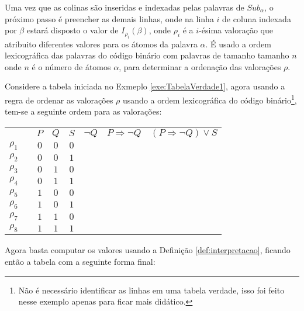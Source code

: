 Uma vez que as colinas são inseridas e indexadas pelas palavras de $Sub_\alpha$, o próximo passo é preencher as demais linhas, onde na linha $i$ de coluna indexada por $\beta$ estará disposto o valor de $I_{\rho_i}(\beta)$, onde $\rho_i$ é a $i$-ésima valoração que atribuito diferentes valores para os átomos da palavra $\alpha$. É usado  a ordem lexicográfica das palavras do código binário com palavras de tamanho tamanho $n$ onde $n$ é o número de átomos $\alpha$, para determinar a ordenação das valorações $\rho$. 

\begin{exemplo}\label{exe:TabelaVerdade2}
  Considere a tabela iniciada no Exmeplo \ref{exe:TabelaVerdade1}, agora usando a regra de ordenar as valorações $\rho$ usando a ordem lexicográfica do código binário\footnote{Não é necessário identificar as linhas em uma tabela verdade, isso foi feito nesse exemplo apenas para ficar mais didático.}, tem-se a seguinte ordem para as valorações:

  \begin{table}[H]
    \centering
    \begin{tabular}{|lc|c|c|c|c|c|c|}
      \hline
      & & $P$ & $Q$ & $S$ & $\neg Q$ & $P \Rightarrow \neg Q$ & $(P \Rightarrow \neg Q) \lor S$\\
      $\rho_1$ & & $0$ & $0$ & $0$ & & & \\
      $\rho_2$ & & $0$ & $0$ & $1$ & & & \\
      $\rho_3$ & & $0$ & $1$ & $0$ & & & \\
      $\rho_4$ & & $0$ & $1$ & $1$ & & & \\
      $\rho_5$ & & $1$ & $0$ & $0$ & & & \\
      $\rho_6$ & & $1$ & $0$ & $1$ & & & \\
      $\rho_7$ & & $1$ & $1$ & $0$ & & & \\
      $\rho_8$ & & $1$ & $1$ & $1$ & & & \\
      \hline
    \end{tabular}
  \end{table}

  Agora basta computar os valores usando a Definição \ref{def:interpretacao}, ficando então a tabela com a seguinte forma final:


\end{exemplo}

